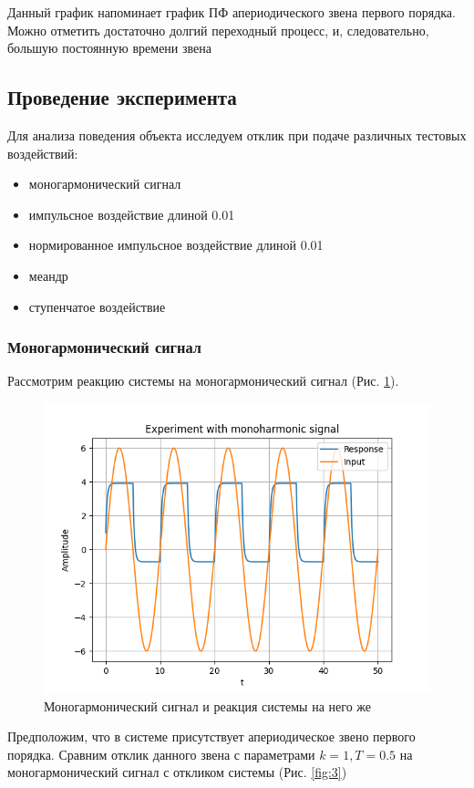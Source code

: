 Данный график напоминает график ПФ апериодического звена первого порядка. Можно отметить достаточно долгий переходный процесс,
и, следовательно, большую постоянную времени звена

\subsection{Проведение эксперимента}
Для анализа поведения объекта исследуем отклик при подаче различных тестовых воздействий:
\begin{itemize}
	\item моногармонический сигнал
	\item импульсное воздействие длиной 0.01
	\item нормированное импульсное воздействие длиной 0.01
	\item меандр
	\item ступенчатое воздействие
\end{itemize}

\subsubsection{Моногармонический сигнал}
Рассмотрим реакцию системы на моногармонический сигнал (Рис. \ref{fig:2}).

\begin{figure}[H]
	\centering
	\includegraphics[width=0.9\linewidth]{body/images/Experiment-with-monoharmonic-signal.png}
	\caption{Моногармонический сигнал и реакция системы на него же}
	\label{fig:2}
\end{figure}

Предположим, что в системе присутствует апериодическое звено первого порядка. Сравним отклик данного звена с параметрами $ k = 1, T = 0.5 $ на моногармонический сигнал с откликом системы (Рис. \ref{fig:3})

